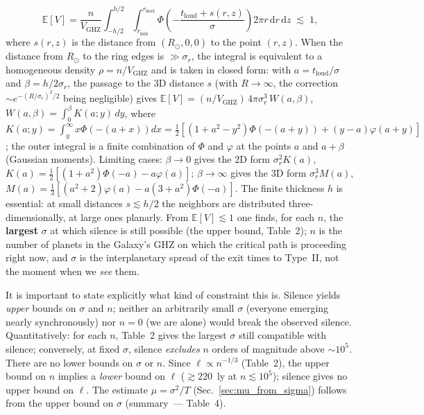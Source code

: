 \documentclass[11pt,a4paper]{article}
\begin{document}
\begin{equation}
\boxed{\;\mathbb{E}[V] = \frac{n}{V_{\mathrm{GHZ}}}\int_{-h/2}^{h/2}\!\!\int_{r_{\min}}^{r_{\max}} \Phi\!\left(-\frac{t_{\mathrm{loud}}+s(r,z)}{\sigma}\right) 2\pi r\,\mathrm{d}r\,\mathrm{d}z \;\lesssim\; 1,\;}
\end{equation}
where $s(r,z)$ is the distance from $(R_\odot,0,0)$ to the point $(r,z)$. When the distance from $R_\odot$ to the ring edges is $\gg\sigma_r$, the integral is equivalent to a homogeneous density $\rho=n/V_{\mathrm{GHZ}}$ and is taken in closed form: with $a=t_{\mathrm{loud}}/\sigma$ and $\beta=h/2\sigma_r$, the passage to the 3D distance $s$ (with $R\to\infty$, the correction $\sim e^{-(R/\sigma_r)^2/2}$ being negligible) gives $\mathbb{E}[V]=(n/V_{\mathrm{GHZ}})\,4\pi\sigma_r^3\,W(a,\beta)$, $W(a,\beta)=\int_0^\beta K(a;y)\,dy$, where $K(a;y)=\int_y^\infty x\Phi(-(a+x))dx=\tfrac12[(1+a^2-y^2)\Phi(-(a+y))+(y-a)\varphi(a+y)]$; the outer integral is a finite combination of $\Phi$ and $\varphi$ at the points $a$ and $a+\beta$ (Gaussian moments). Limiting cases: $\beta\to0$ gives the 2D form $\sigma_r^2 K(a)$, $K(a)=\tfrac12[(1+a^2)\Phi(-a)-a\varphi(a)]$; $\beta\to\infty$ gives the 3D form $\sigma_r^3 M(a)$, $M(a)=\tfrac13[(a^2+2)\varphi(a)-a(3+a^2)\Phi(-a)]$. The finite thickness $h$ is essential: at small distances $s \lesssim h/2$ the neighbors are distributed three-dimensionally, at large ones planarly. From $\mathbb{E}[V]\lesssim 1$ one finds, for each $n$, the \textbf{largest} $\sigma$ at which silence is still possible (the upper bound, Table~2); $n$ is the number of planets in the Galaxy's GHZ on which the critical path is proceeding right now, and $\sigma$ is the interplanetary spread of the exit times to Type~II, not the moment when we \emph{see} them.

It is important to state explicitly what kind of constraint this is. Silence yields \emph{upper} bounds on $\sigma$ and $n$; neither an arbitrarily small $\sigma$ (everyone emerging nearly synchronously) nor $n=0$ (we are alone) would break the observed silence. Quantitatively: for each $n$, Table~2 gives the largest $\sigma$ still compatible with silence; conversely, at fixed $\sigma$, silence \emph{excludes} $n$ orders of magnitude above $\sim10^5$. There are no lower bounds on $\sigma$ or $n$. Since $\ell \propto n^{-1/3}$ (Table~2), the upper bound on $n$ implies a \emph{lower} bound on $\ell$ ($\gtrsim 220$~ly at $n \lesssim 10^5$); silence gives no upper bound on $\ell$. The estimate $\mu=\sigma^2/T$ (Sec.~\ref{sec:mu_from_sigma}) follows from the upper bound on $\sigma$ (summary~--- Table~4).
\end{document}

